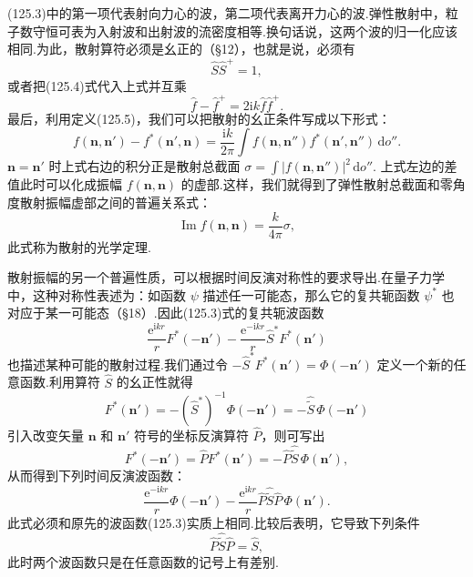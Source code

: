 (125.3)中的第一项代表射向力心的波，第二项代表离开力心的波.弹性散射中，粒子数守恒可表为入射波和出射波的流密度相等.换句话说，这两个波的归一化应该相同.为此，散射算符必须是幺正的（§12），也就是说，必须有
\begin{equation}
  \hat{S}\hat{S}^{+}=1,
\end{equation}
或者把(125.4)式代入上式并互乘
\begin{equation}
  \hat{f}-\hat{f}^{+}=2\mathrm{i}k\hat{f}\hat{f}^{+}.
\end{equation}
最后，利用定义(125.5)，我们可以把散射的幺正条件写成以下形式：
\begin{equation}
  f(\boldsymbol{n},\boldsymbol{n}')-f^{*}(\boldsymbol{n}',\boldsymbol{n})
  =\frac{\mathrm{i}k}{2\pi}
  \int f(\boldsymbol{n},\boldsymbol{n}'')f^{*}(\boldsymbol{n}',\boldsymbol{n}'')\,
  \mathrm{d}o''.
\end{equation}
$\boldsymbol{n}=\boldsymbol{n}'$ 时上式右边的积分正是散射总截面
$\sigma=\int|f(\boldsymbol{n},\boldsymbol{n}'')|^2\,\mathrm{d}o''$.
上式左边的差值此时可以化成振幅 $f(\boldsymbol{n},\boldsymbol{n})$ 的虚部.这样，我们就得到了弹性散射总截面和零角度散射振幅虚部之间的普遍关系式：
\begin{equation}
  \operatorname{Im}f(\boldsymbol{n},\boldsymbol{n})=\frac{k}{4\pi}\sigma,
\end{equation}
此式称为散射的光学定理.

散射振幅的另一个普遍性质，可以根据时间反演对称性的要求导出.在量子力学中，这种对称性表述为：如函数 $\psi$ 描述任一可能态，那么它的复共轭函数 $\psi^{*}$ 也对应于某一可能态（§18）.因此(125.3)式的复共轭波函数
\begin{equation*}
  \frac{\mathrm{e}^{\mathrm{i}kr}}{r}F^{*}(-\boldsymbol{n}')
  -\frac{\mathrm{e}^{-\mathrm{i}kr}}{r}\hat{S}^{*}F^{*}(\boldsymbol{n}')
\end{equation*}
也描述某种可能的散射过程.我们通过令
$-\hat{S}^{*}F^{*}(\boldsymbol{n}')=\Phi(-\boldsymbol{n}')$
定义一个新的任意函数.利用算符 $\hat{S}$ 的幺正性就得
\begin{equation*}
  F^{*}(\boldsymbol{n}')
  =-\left(\hat{S}^{*}\right)^{-1}\Phi(-\boldsymbol{n}')
  =-\hat{\tilde{S}}\,\Phi(-\boldsymbol{n}')
\end{equation*}
引入改变矢量 $\boldsymbol{n}$ 和 $\boldsymbol{n}'$ 符号的坐标反演算符 $\hat{P}$，则可写出
\begin{equation*}
  F^{*}(-\boldsymbol{n}')=\hat{P}F^{*}(\boldsymbol{n}')
  =-\hat{P}\hat{\tilde{S}}\,\Phi(\boldsymbol{n}'),
\end{equation*}
从而得到下列时间反演波函数：
\begin{equation*}
  \frac{\mathrm{e}^{-\mathrm{i}kr}}{r}\Phi(-\boldsymbol{n}')
  -\frac{\mathrm{e}^{\mathrm{i}kr}}{r}
  \hat{P}\hat{\tilde{S}}\hat{P}\,\Phi(\boldsymbol{n}').
\end{equation*}
此式必须和原先的波函数(125.3)实质上相同.比较后表明，它导致下列条件
\begin{equation}
  \hat{P}\hat{\tilde{S}}\hat{P}=\hat{S},
\end{equation}
此时两个波函数只是在任意函数的记号上有差别.

